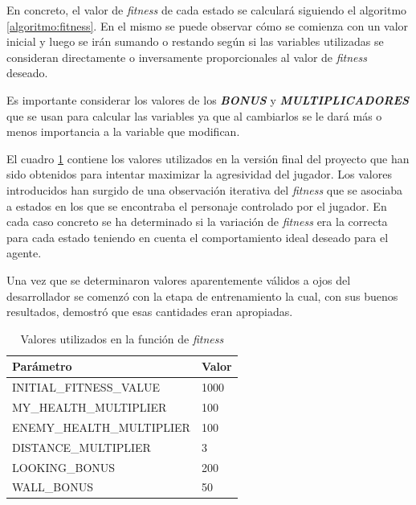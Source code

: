 \bigskip

En concreto, el valor de \textit{fitness} de cada estado se calculará siguiendo el algoritmo \ref{algoritmo:fitness}. En el mismo se puede observar cómo se comienza con un valor inicial y luego se irán sumando o restando según si las variables utilizadas se consideran directamente o inversamente proporcionales al valor de \textit{fitness} deseado.

\bigskip

Es importante considerar los valores de los \textbf{\textit{BONUS}} y \textbf{\textit{MULTIPLICADORES}} que se usan para calcular las variables ya que al cambiarlos se le dará más o menos importancia a la variable que modifican.

\bigskip

El cuadro \ref{algoritmo:valores} contiene los valores utilizados en la versión final del proyecto que han sido obtenidos para intentar maximizar la agresividad del jugador. Los valores introducidos han surgido de una observación iterativa del \textit{fitness} que se asociaba a estados en los que se encontraba el personaje controlado por el jugador. En cada caso concreto se ha determinado si la variación de \textit{fitness} era la correcta para cada estado teniendo en cuenta el comportamiento ideal deseado para el agente.

\bigskip

Una vez que se determinaron valores aparentemente válidos a ojos del desarrollador se comenzó con la etapa de entrenamiento la cual, con sus buenos resultados, demostró que esas cantidades eran apropiadas.

\bigskip

\begin{table}
	\begin{center}
		\begin{tabular}{|l|l|}
			\hline
			\textbf{Parámetro} & \textbf{Valor}\\
			
			\hline
			INITIAL\_FITNESS\_VALUE& 1000\\
			
			\hline
			MY\_HEALTH\_MULTIPLIER& 100\\
			
			\hline
			ENEMY\_HEALTH\_MULTIPLIER& 100\\
			
			\hline
			DISTANCE\_MULTIPLIER& 3\\
			
			\hline
			LOOKING\_BONUS& 200\\
			
			\hline
			WALL\_BONUS& 50\\
			
			\hline
		\end{tabular}
		\caption{Valores utilizados en la función de \textit{fitness}}
		\label{algoritmo:valores}
	\end{center}
\end{table}


